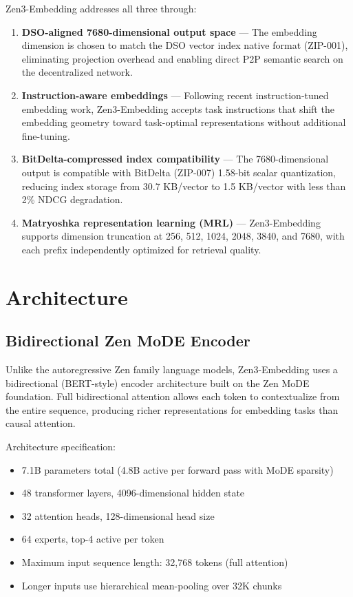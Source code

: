 \documentclass[11pt,a4paper]{article}
\begin{document}
Zen3-Embedding addresses all three through:

\begin{enumerate}
\item \textbf{DSO-aligned 7680-dimensional output space} --- The embedding dimension
      is chosen to match the DSO vector index native format (ZIP-001), eliminating
      projection overhead and enabling direct P2P semantic search on the decentralized
      network.
\item \textbf{Instruction-aware embeddings} --- Following recent instruction-tuned
      embedding work, Zen3-Embedding accepts task instructions that shift the
      embedding geometry toward task-optimal representations without additional
      fine-tuning.
\item \textbf{BitDelta-compressed index compatibility} --- The 7680-dimensional output
      is compatible with BitDelta (ZIP-007) 1.58-bit scalar quantization, reducing
      index storage from 30.7 KB/vector to 1.5 KB/vector with less than 2\% NDCG degradation.
\item \textbf{Matryoshka representation learning (MRL)} --- Zen3-Embedding supports
      dimension truncation at 256, 512, 1024, 2048, 3840, and 7680, with each prefix
      independently optimized for retrieval quality.
\end{enumerate}

\section{Architecture}
\label{sec:arch}

\subsection{Bidirectional Zen MoDE Encoder}

Unlike the autoregressive Zen family language models, Zen3-Embedding uses a
bidirectional (BERT-style) encoder architecture built on the Zen MoDE foundation.
Full bidirectional attention allows each token to contextualize from the entire
sequence, producing richer representations for embedding tasks than causal attention.

Architecture specification:
\begin{itemize}
\item 7.1B parameters total (4.8B active per forward pass with MoDE sparsity)
\item 48 transformer layers, 4096-dimensional hidden state
\item 32 attention heads, 128-dimensional head size
\item 64 experts, top-4 active per token
\item Maximum input sequence length: 32,768 tokens (full attention)
\item Longer inputs use hierarchical mean-pooling over 32K chunks
\end{itemize}
\end{document}
